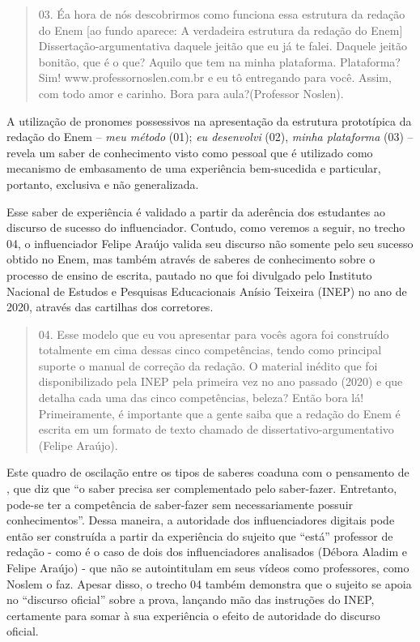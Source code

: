 \documentclass[portuguese]{textolivre}
\begin{document}
\begin{quote}
    03. Éa hora de nós descobrirmos como funciona essa estrutura da redação do Enem [ao fundo aparece: A verdadeira estrutura da redação do Enem] Dissertação-argumentativa daquele jeitão que eu já te falei. Daquele jeitão bonitão, que é o que? Aquilo que tem na minha plataforma. Plataforma? Sim! www.professornoslen.com.br e eu tô entregando para você. Assim, com todo amor e carinho. Bora para aula?(Professor Noslen).
\end{quote}

A utilização de pronomes possessivos na apresentação da estrutura prototípica da redação do Enem – \textit{meu método} (01); \textit{eu desenvolvi} (02), \textit{minha plataforma} (03) – revela um saber de conhecimento visto como pessoal que é utilizado como mecanismo de embasamento de uma experiência bem-sucedida e particular, portanto, exclusiva e não generalizada.

Esse saber de experiência é validado a partir da aderência dos estudantes ao discurso de sucesso do influenciador. Contudo, como veremos a seguir, no trecho 04, o influenciador Felipe Araújo valida seu discurso não somente pelo seu sucesso obtido no Enem, mas também através de saberes de conhecimento sobre o processo de ensino de escrita, pautado no que foi divulgado pelo Instituto Nacional de Estudos e Pesquisas Educacionais Anísio Teixeira (INEP) no ano de 2020, através das cartilhas dos corretores. 

\begin{quote}
    04. Esse modelo que eu vou apresentar para vocês agora foi construído totalmente em cima dessas cinco competências, tendo como principal suporte o manual de correção da redação. O material inédito que foi disponibilizado pela INEP pela primeira vez no ano passado (2020) e que detalha cada uma das cinco competências, beleza? Então bora lá! Primeiramente, é importante que a gente saiba que a redação do Enem é escrita em um formato de texto chamado de dissertativo-argumentativo (Felipe Araújo).
\end{quote}

Este quadro de oscilação entre os tipos de saberes coaduna com o pensamento de \textcite[p. 16]{charaudeau_conquista_2020}, que diz que “o saber precisa ser complementado pelo saber-fazer. Entretanto, pode-se ter a competência de saber-fazer sem necessariamente possuir conhecimentos”. Dessa maneira, a autoridade dos influenciadores digitais pode então ser construída a partir da experiência do sujeito que “está” professor de redação - como é o caso de dois dos influenciadores analisados (Débora Aladim e Felipe Araújo) - que não se autointitulam em seus vídeos como professores, como Noslem o faz. Apesar disso, o trecho 04 também demonstra que o sujeito se apoia no “discurso oficial” sobre a prova, lançando mão das instruções do INEP, certamente para somar à sua experiência o efeito de autoridade do discurso oficial. 
\end{document}
